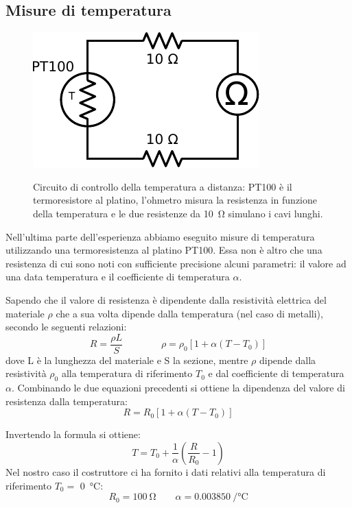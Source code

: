 \subsection{Misure di temperatura}

\begin{figure}
\centering
\caption{Circuito di controllo della temperatura a distanza: PT100 è il termoresistore al platino, l'ohmetro misura la resistenza in funzione della temperatura e le due resistenze da \SI{10}{\ohm} simulano i cavi lunghi.}
\includegraphics[width=.25\textwidth]{../E05/latex/c_PT100_2wire.pdf}
\label{cir5:2wire}
\end{figure}

Nell'ultima parte dell'esperienza abbiamo eseguito misure di temperatura utilizzando una termoresistenza al platino PT100.
Essa non è altro che una resistenza di cui sono noti con sufficiente precisione alcuni parametri: il valore ad una data temperatura e il coefficiente di temperatura $\alpha$.

Sapendo che il valore di resistenza è dipendente dalla resistività elettrica del materiale $\rho$ che a sua volta dipende dalla temperatura (nel caso di metalli), secondo le seguenti relazioni:
	$$	R = \frac{\rho L}{S}
			\qquad \qquad
		\rho = \rho_0 \left[ 1 + \alpha \left( T - T_0 \right) \right]$$
dove L è la lunghezza del materiale e S la sezione, mentre $\rho$ dipende dalla resistività $\rho_0$ alla temperatura di riferimento $T_0$ e dal coefficiente di temperatura $\alpha$.
Combinando le due equazioni precedenti si ottiene la dipendenza del valore di resistenza dalla temperatura:
\begin{equation}
R = R_0 \left[ 1 + \alpha \left( T - T_0 \right) \right]
\end{equation}



Invertendo la formula si ottiene:
\begin{equation}
T = T_0 + \frac{1}{\alpha}\left( \frac{R}{R_0}-1 \right)
\end{equation}
Nel nostro caso il costruttore ci ha fornito i dati relativi alla temperatura di riferimento $T_0 =$ \SI{0}{\degreeCelsius}:
$$R_0 = \SI{100}{\ohm} \quad \quad \alpha = \SI{0.003850}{\per\degreeCelsius}$$

